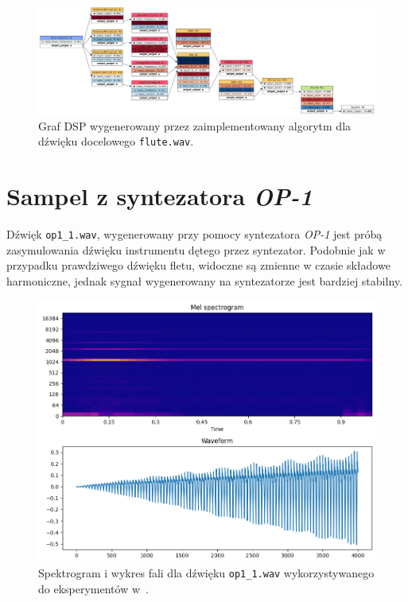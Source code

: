 \begin{figure}[H]
    \centering
    \includegraphics[angle=90,width=0.45\linewidth]{rys06/evolved_graph_flute.png}
    \caption{
      Graf DSP wygenerowany przez zaimplementowany algorytm
      dla dźwięku docelowego \texttt{flute.wav}.
    }\label{fig:evolved_graph_flute}
\end{figure}



\section{Sampel z syntezatora \textit{OP-1}}

Dźwięk \texttt{op1\_1.wav}, wygenerowany przy pomocy syntezatora \textit{OP-1} jest próbą
zasymulowania dźwięku instrumentu dętego przez syntezator. Podobnie jak w przypadku
prawdziwego dźwięku fletu, widoczne są zmienne w czasie składowe harmoniczne, jednak
sygnał wygenerowany na syntezatorze jest bardziej stabilny.

\begin{figure}[H]
    \centering
    \includegraphics[width=0.7\linewidth]{rys06/target_sample_op1_literature.png}
    \caption{
      Spektrogram i wykres fali dla dźwięku \texttt{op1\_1.wav} wykorzystywanego
      do eksperymentów w~\cite{evolutionary_puredata_results}.
    }\label{fig:literature_op_1_sound_overview}
\end{figure}


